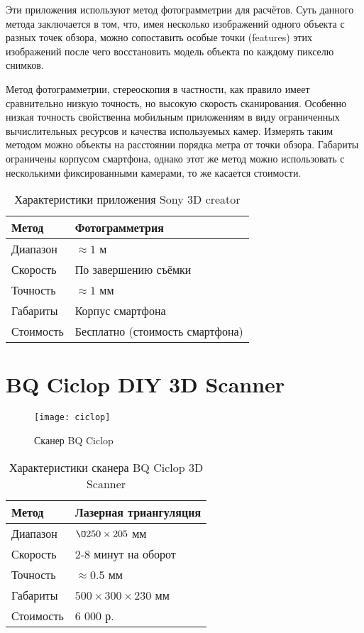         Эти приложения используют метод фотограмметрии для расчётов. Суть данного метода заключается в том, что, имея несколько изображений одного объекта с разных точек обзора, можно сопоставить особые точки (features) этих изображений после чего восстановить модель объекта по каждому пикселю снимков.

        Метод фотограмметрии, стереоскопия в частности, как правило имеет сравнительно низкую точность, но высокую скорость сканирования. Особенно низкая точность свойственна мобильным приложениям в виду ограниченных вычислительных ресурсов и качества используемых камер. Измерять таким методом можно объекты на расстоянии порядка метра от точки обзора. Габариты ограничены корпусом смартфона, однако этот же метод можно использовать с несколькими фиксированными камерами, то же касается стоимости.

        \begin{table}[H]
            \centering
            \caption{Характеристики приложения Sony 3D creator}\label{table:sony3d}
            \begin{tabular}{|l|l|}\hline
                Метод&Фотограмметрия\\ \hline
                Диапазон&$\approx 1$ м\\ \hline
                Скорость&По завершению съёмки\\\hline
                Точность&$\approx 1$ мм\\ \hline
                Габариты&Корпус смартфона\\ \hline
                Стоимость&Бесплатно (стоимость смартфона)\\ \hline
            \end{tabular}
        \end{table}

    \section{BQ Ciclop DIY 3D Scanner}
        \begin{figure}[!ht]
            \centering
            \texttt{[image: ciclop]}\label{pic:ciclop}
            \caption{Сканер BQ Ciclop}
        \end{figure}
        \lipsum[1-1]
        \begin{table}[H]
            \centering
            \caption{Характеристики сканера BQ Ciclop 3D Scanner}\label{table:ciclop}
            \begin{tabular}{|l|l|}\hline
            Метод&Лазерная триангуляция\\ \hline
            Диапазон&$\O250 \times 205$ мм\\ \hline
            Скорость&2-8 минут на оборот\\\hline
            Точность&$\approx 0.5$ мм\\ \hline
            Габариты&$ 500 \times 300 \times 230 $ мм\\ \hline
            Стоимость&6 000 р.\\ \hline
            \end{tabular}
        \end{table}

